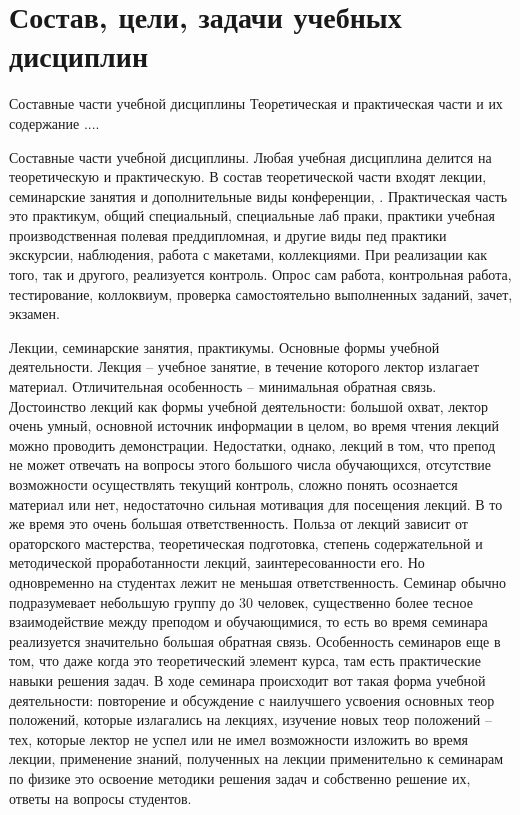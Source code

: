 \documentclass[a4paper, 12pt]{article}
\begin{document}

\section{Состав, цели, задачи учебных дисциплин}

Составные части учебной дисциплины
Теоретическая и практическая части и их содержание
....

Составные части учебной дисциплины. Любая учебная дисциплина делится на 
теоретическую и практическую. В состав теоретической части входят 
лекции, семинарские занятия и дополнительные виды конференции, 
. Практическая часть это практикум, общий специальный, специальные лаб 
праки, практики учебная производственная полевая преддипломная, и другие 
виды пед практики экскурсии, наблюдения, работа с макетами, коллекциями. 
При реализации как того, так и другого, реализуется контроль. Опрос сам 
работа, контрольная работа, тестирование, коллоквиум, проверка 
самостоятельно выполненных заданий, зачет, экзамен.

Лекции, семинарские занятия, практикумы. Основные формы учебной 
деятельности. Лекция -- учебное занятие, в течение которого лектор 
излагает материал. Отличительная особенность -- минимальная обратная 
связь. Достоинство лекций как формы учебной деятельности: большой охват, 
лектор очень умный, основной источник информации в целом, во время 
чтения лекций можно проводить демонстрации. Недостатки, однако, лекций 
в том, что препод не может отвечать на вопросы этого большого числа 
обучающихся, отсутствие возможности осуществлять текущий контроль, 
сложно понять осознается материал или нет, недостаточно сильная 
мотивация для посещения лекций. В то же время это очень большая 
ответственность. Польза от лекций зависит от ораторского мастерства, 
теоретическая подготовка, степень содержательной и методической 
проработанности лекций, заинтересованности его. Но одновременно на 
студентах лежит не меньшая ответственность. Семинар обычно подразумевает 
небольшую группу до 30 человек, существенно более тесное взаимодействие 
между преподом и обучающимися, то есть во время семинара реализуется 
значительно большая обратная связь. Особенность семинаров еще в том, что 
даже когда это теоретический элемент курса, там есть практические навыки 
решения задач. В ходе семинара происходит вот такая форма учебной 
деятельности: повторение и обсуждение с наилучшего усвоения основных 
теор положений, которые излагались на лекциях, изучение новых теор 
положений -- тех, которые лектор не успел или не имел возможности 
изложить во время лекции, применение знаний, полученных на лекции 
применительно к семинарам по физике это освоение методики решения задач 
и собственно решение их, ответы на вопросы студентов.
\end{document}
